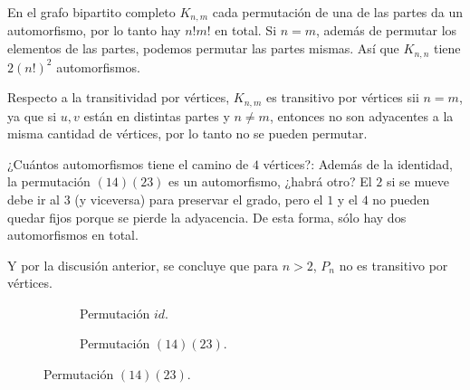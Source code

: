 \begin{ejem}
    En el grafo bipartito completo $K_{n,m}$ cada permutación de una de las partes da un automorfismo, por lo tanto hay $n!m!$ en total. Si $n = m$, además de permutar los elementos de las partes, podemos permutar las partes mismas. Así que $K_{n,n}$ tiene $2(n!)^2$ automorfismos.
    
    Respecto a la transitividad por vértices, $K_{n,m}$ es transitivo por vértices sii $n = m$, ya que si $u, v$ están en distintas partes y $n \neq m$, entonces no son adyacentes a la misma cantidad de vértices, por lo tanto no se pueden permutar.
\end{ejem}

\begin{ejem}
    ¿Cuántos automorfismos tiene el camino de $4$ vértices?: Además de la identidad, la permutación $(14)(23)$ es un automorfismo, ¿habrá otro? El $2$ si se mueve debe ir al $3$ (y viceversa) para preservar el grado, pero el $1$ y el $4$ no pueden quedar fijos porque se pierde la adyacencia. De esta forma, sólo hay dos automorfismos en total.
    
    Y por la discusión anterior, se concluye que para $n > 2$, $P_n$ no es transitivo por vértices.
    
    \begin{figure}
        \begin{subfigure}[b]{0.5\textwidth}
        \centering
            \caption{Permutación $id$.}
        \end{subfigure}
        \hfill
        \begin{subfigure}[b]{0.5\textwidth}
        \centering
            \caption{Permutación $(14)(23)$.}
        \end{subfigure}
    \end{figure}
\end{ejem}